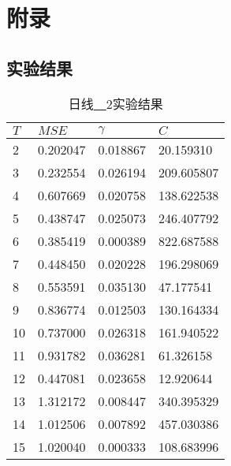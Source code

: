 
\chapter{附录}

\section{实验结果}

\begin{table}[ht]
    \centering
    \caption{日线\underline{~~}2实验结果}
    \begin{tabular}{llll}
        \hline
        $T$&     $MSE$ &  $\gamma$ &         $C$ \\
        \hline
         2 &  0.202047 &  0.018867 &   20.159310 \\
         3 &  0.232554 &  0.026194 &  209.605807 \\
         4 &  0.607669 &  0.020758 &  138.622538 \\
         5 &  0.438747 &  0.025073 &  246.407792 \\
         6 &  0.385419 &  0.000389 &  822.687588 \\
         7 &  0.448450 &  0.020228 &  196.298069 \\
         8 &  0.553591 &  0.035130 &   47.177541 \\
         9 &  0.836774 &  0.012503 &  130.164334 \\
        10 &  0.737000 &  0.026318 &  161.940522 \\
        11 &  0.931782 &  0.036281 &   61.326158 \\
        12 &  0.447081 &  0.023658 &   12.920644 \\
        13 &  1.312172 &  0.008447 &  340.395329 \\
        14 &  1.012506 &  0.007892 &  457.030386 \\
        15 &  1.020040 &  0.000333 &  108.683996 \\
        \hline
    \end{tabular}
\end{table}

